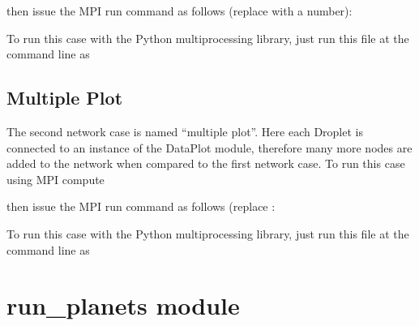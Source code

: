 \documentclass[letterpaper,10pt,openany,oneside,english]{sphinxmanual}
\begin{document}
then issue the MPI run command as follows (replace  with a number):
\begin{quote}

\end{quote}

To run this case with the Python multiprocessing library, just run this file at the
command line as
\begin{quote}

\end{quote}


\subsection{Multiple Plot}
\label{\detokenize{examples_rst/run_droplet_test:multiple-plot}}
The second network case is named “multiple plot”. Here each Droplet is connected to an
instance of the DataPlot module, therefore many more nodes are added to the network
when compared to the first network case. To run this case using MPI compute
\begin{quote}

\end{quote}

then issue the MPI run command as follows (replace :
\begin{quote}

\end{quote}

To run this case with the Python multiprocessing library, just run this file at the
command line as
\begin{quote}

\end{quote}


\section{run\_planets module}
\label{\detokenize{examples_rst/run_planets:module-run_planets}}\label{\detokenize{examples_rst/run_planets:run-planets-module}}\label{\detokenize{examples_rst/run_planets::doc}}

\begin{fulllineitems}
\label{\detokenize{examples_rst/run_planets:run_planets.main}}
\end{fulllineitems}
\end{document}
